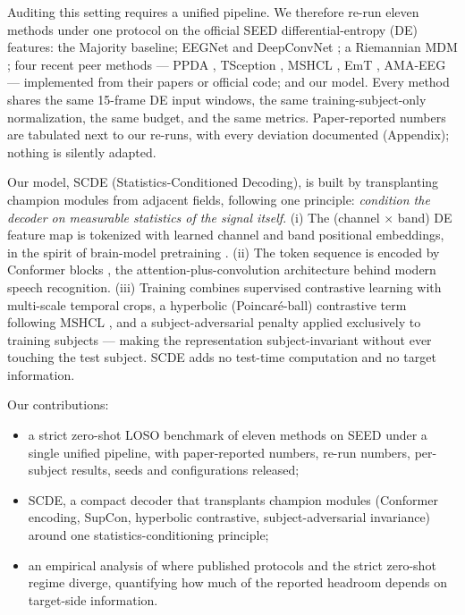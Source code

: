 \documentclass{article}
\newcommand{\method}{SCDE}
\begin{document}
Auditing this setting requires a unified pipeline. We therefore re-run
eleven methods under one protocol on the official SEED differential-entropy
(DE) features: the Majority baseline; EEGNet \citep{lawhern2018eegnet} and
DeepConvNet \citep{schirrmeister2017deep}; a Riemannian MDM
\citep{barachant2013riemannian}; four recent peer methods --- PPDA
\citep{zhao2021ppda}, TSception \citep{ding2023tsception}, MSHCL
\citep{chang2025mshcl}, EmT \citep{ding2025emt}, AMA-EEG
\citep{liu2026amaeeg} --- implemented from their papers or official code;
and our model. Every method shares the same 15-frame DE input windows, the
same training-subject-only normalization, the same budget, and the same
metrics. Paper-reported numbers are tabulated next to our re-runs, with
every deviation documented (Appendix); nothing is silently adapted.

Our model, \method{} (Statistics-Conditioned Decoding), is built by
transplanting champion modules from adjacent fields, following one
principle: \emph{condition the decoder on measurable statistics of the
signal itself}. (i) The (channel $\times$ band) DE feature map is tokenized
with learned channel and band positional embeddings, in the spirit of
brain-model pretraining \citep{jiang2024labram}. (ii) The token sequence is
encoded by Conformer blocks \citep{gulati2020conformer}, the
attention-plus-convolution architecture behind modern speech recognition.
(iii) Training combines supervised contrastive learning \citep{khosla2020supcon}
with multi-scale temporal crops, a hyperbolic (Poincar\'e-ball) contrastive
term following MSHCL \citep{chang2025mshcl}, and a subject-adversarial
penalty \citep{ganin2016dann} applied exclusively to training subjects ---
making the representation subject-invariant without ever touching the test
subject. \method{} adds no test-time computation and no target information.

Our contributions:
\begin{itemize}\itemsep0pt
\item a strict zero-shot LOSO benchmark of eleven methods on SEED under a
single unified pipeline, with paper-reported numbers, re-run numbers,
per-subject results, seeds and configurations released;
\item \method{}, a compact decoder that transplants champion modules
(Conformer encoding, SupCon, hyperbolic contrastive, subject-adversarial
invariance) around one statistics-conditioning principle;
\item an empirical analysis of where published protocols and the strict
zero-shot regime diverge, quantifying how much of the reported headroom
depends on target-side information.
\end{itemize}
\end{document}

